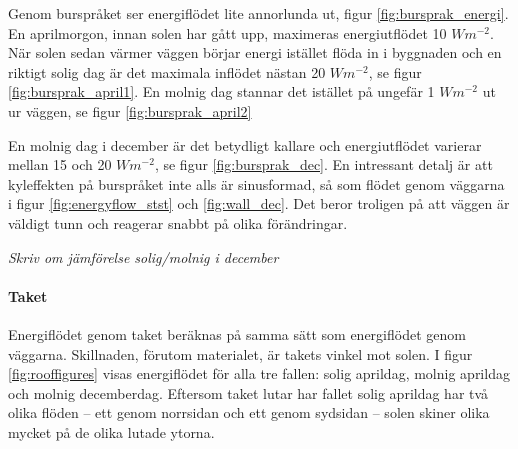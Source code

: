 Genom burspråket ser energiflödet lite annorlunda ut, figur \ref{fig:bursprak_energi}. En aprilmorgon, innan solen har gått upp, maximeras energiutflödet 10 $\unit{W m^{-2}}$. När solen sedan värmer väggen börjar energi istället flöda in i byggnaden och en riktigt solig dag är det maximala inflödet nästan 20 $\unit{W m^{-2}}$, se figur \ref{fig:bursprak_april1}. En molnig dag stannar det istället på ungefär 1 $\unit{W m^{-2}}$ ut ur väggen, se figur \ref{fig:bursprak_april2}

 En molnig dag  i december är det betydligt kallare och energiutflödet varierar mellan 15 och 20 $\unit{W m^{-2}}$, se figur \ref{fig:bursprak_dec}. En intressant detalj är att kyleffekten på burspråket inte alls är sinusformad, så som flödet genom väggarna i figur \ref{fig:energyflow_stst} och \ref{fig:wall_dec}. Det beror troligen på att väggen är väldigt tunn och reagerar snabbt på olika förändringar.

\emph{\color{red} Skriv om jämförelse solig/molnig i december}

\paragraph{Taket}

Energiflödet genom taket beräknas på samma sätt som energiflödet genom väggarna. Skillnaden, förutom materialet, är takets vinkel mot solen. I figur \ref{fig:rooffigures} visas energiflödet för alla tre fallen: solig aprildag, molnig aprildag och molnig decemberdag. Eftersom taket lutar har fallet solig aprildag har två olika flöden – ett genom norrsidan och ett genom sydsidan – solen skiner olika mycket på de olika lutade ytorna.

